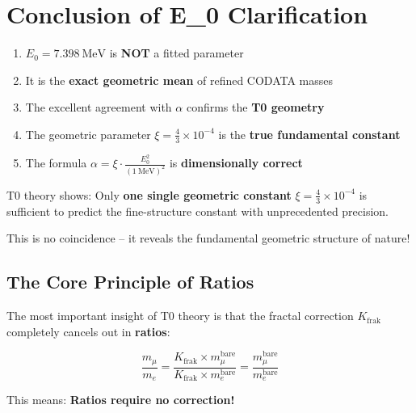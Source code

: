 \documentclass[12pt,a4paper]{article}
\theoremstyle{definition}
\begin{document}
	\section{Conclusion of E\_0 Clarification}
	
	\begin{tcolorbox}[colback=red!5!white,colframe=red!75!black,title=E\_0 Analysis Summary]
		\begin{enumerate}
			\item $E_0 = \SI{7.398}{\MeV}$ is \textbf{NOT} a fitted parameter
			\item It is the \textbf{exact geometric mean} of refined CODATA masses
			\item The excellent agreement with $\alpha$ confirms the \textbf{T0 geometry}
			\item The geometric parameter $\xi = \frac{4}{3} \times 10^{-4}$ is the \textbf{true fundamental constant}
			\item The formula $\alpha = \xi \cdot \frac{E_0^2}{( \SI{1}{\MeV} )^2}$ is \textbf{dimensionally correct}
		\end{enumerate}
	\end{tcolorbox}
	
	\begin{tcolorbox}[colback=green!10!white,colframe=green!75!black,title=The Revolutionary E\_0 Insight]
		T0 theory shows: Only \textbf{one single geometric constant} $\xi = \frac{4}{3} \times 10^{-4}$ is sufficient to predict the fine-structure constant with unprecedented precision.
		
		This is no coincidence -- it reveals the fundamental geometric structure of nature!
	\end{tcolorbox}
	
	\subsection{The Core Principle of Ratios}
	
	\begin{tcolorbox}[colback=blue!10!white,colframe=blue!75!black,title=Fractal Corrections Cancel Out in Ratios]
		The most important insight of T0 theory is that the fractal correction $K_{\text{frak}}$ completely cancels out in \textbf{ratios}:
		
		\begin{equation}
			\frac{m_\mu}{m_e} = \frac{K_{\text{frak}} \times m_\mu^{\text{bare}}}{K_{\text{frak}} \times m_e^{\text{bare}}} = \frac{m_\mu^{\text{bare}}}{m_e^{\text{bare}}}
		\end{equation}
		
		This means: \textbf{Ratios require no correction!}
	\end{tcolorbox}
	
\end{document}

